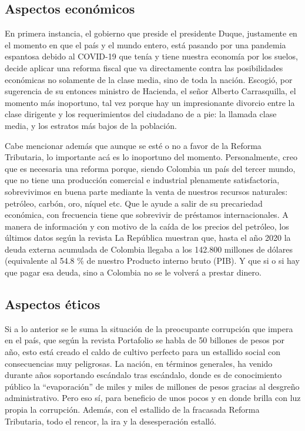 \documentclass[doc, 12pt, letterpaper, donotrepeattitle, floatsintext, natbib]{apa7}
\begin{document}
\subsection{Aspectos económicos} 
En primera instancia, el gobierno que preside el presidente Duque, justamente en el momento en que el país y el mundo entero, está pasando por una pandemia espantosa debido al COVID-19 que tenía y tiene nuestra economía por los suelos, decide aplicar una reforma fiscal que va directamente contra las posibilidades económicas no solamente de la clase media, sino de toda la nación. Escogió, por sugerencia de su entonces ministro de Hacienda, el señor Alberto Carrasquilla, el momento más inoportuno, tal vez porque hay un impresionante divorcio entre la clase dirigente y los requerimientos del ciudadano de a pie: la llamada clase media, y los estratos más bajos de la población.

Cabe mencionar además que aunque se esté o no a favor de la Reforma Tributaria, lo importante acá es lo inoportuno del momento. Personalmente, creo que es necesaria una reforma porque, siendo Colombia un país del tercer mundo, que no tiene una producción comercial e industrial plenamente satisfactoria, sobrevivimos en buena parte mediante la venta de nuestros recursos naturales: petróleo, carbón, oro, níquel etc. Que le ayude a salir de su precariedad económica, con frecuencia tiene que sobrevivir de préstamos internacionales. A manera de información y con motivo de la caída de los precios del petróleo, los últimos datos según la revista La República muestran que, hasta el año 2020 la deuda externa acumulada de Colombia llegaba a los 142.800 millones de dólares (equivalente al 54.8
\% de nuestro Producto interno bruto (PIB). Y que si o si hay que pagar esa deuda, sino a Colombia no se le volverá a prestar dinero.

\subsection{Aspectos éticos}
Si a lo anterior se le suma la situación de la preocupante corrupción que impera en el país, que según la revista Portafolio se habla de 50 billones de pesos por año, esto está creado el caldo de cultivo perfecto para un estallido social con consecuencias muy peligrosas. La nación, en términos generales, ha venido durante años soportando escándalo tras escándalo, donde es de conocimiento público la “evaporación” de miles y miles de millones de pesos gracias al desgreño administrativo. Pero eso sí, para beneficio de unos pocos y en donde brilla con luz propia la corrupción. Además, con el estallido de la fracasada Reforma Tributaria, todo el rencor, la ira y la desesperación estalló.
\end{document}
